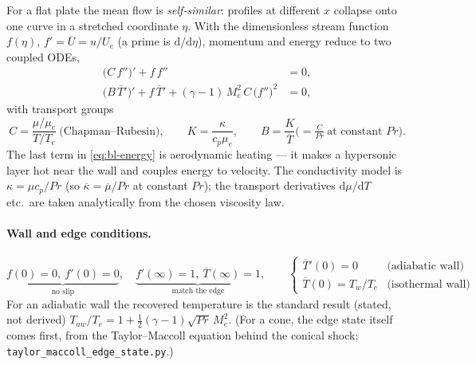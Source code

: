 \documentclass[11pt]{article}
\newcommand{\Mae}{M_e}
\renewcommand{\bar}[1]{\overline{#1}}
\begin{document}
For a flat plate the mean flow is \emph{self-similar}: profiles at different $x$ collapse onto one curve in
a stretched coordinate $\eta$. With the dimensionless stream function $f(\eta)$, $f'=\bar U=u/U_e$ (a prime
is $\mathrm d/\mathrm d\eta$), momentum and energy reduce to two coupled ODEs,
\begin{align}
  \big(C\,f''\big)' + f\,f'' &= 0, \label{eq:bl-mom}\\
  \big(B\,\bar T{}'\big)' + f\,\bar T{}' + (\gamma-1)\,\Mae^2\,C\,\big(f''\big)^2 &= 0, \label{eq:bl-energy}
\end{align}
with transport groups
\begin{equation}
  C=\frac{\mu/\mu_e}{T/T_e}\ \text{(Chapman--Rubesin)},\qquad K=\frac{\kappa}{c_p\mu_e},\qquad
  B=\frac{K}{\bar T}\Big(=\tfrac{C}{\mathit{Pr}}\ \text{at constant }\mathit{Pr}\Big).
\end{equation}
The last term in \eqref{eq:bl-energy} is aerodynamic heating --- it makes a hypersonic layer hot near the
wall and couples energy to velocity. The conductivity model is $\kappa=\mu c_p/\mathit{Pr}$ (so
$\bar\kappa=\bar\mu/\mathit{Pr}$ at constant $\mathit{Pr}$); the transport derivatives
$\mathrm d\mu/\mathrm dT$ etc.\ are taken analytically from the chosen viscosity law.

\paragraph{Wall and edge conditions.}
\begin{equation}\label{eq:blbc}
  \underbrace{f(0)=0,\ f'(0)=0}_{\text{no slip}},\quad
  \underbrace{f'(\infty)=1,\ \bar T(\infty)=1}_{\text{match the edge}},\qquad
  \begin{cases}\bar T{}'(0)=0 &\text{(adiabatic wall)}\\ \bar T(0)=T_w/T_e &\text{(isothermal wall)}\end{cases}
\end{equation}
For an adiabatic wall the recovered temperature is the standard result (stated, not derived)
$T_{aw}/T_e=1+\tfrac12(\gamma-1)\sqrt{\mathit{Pr}}\,\Mae^2$. (For a cone, the edge state itself comes first,
from the Taylor--Maccoll equation behind the conical shock; \texttt{taylor\_maccoll\_edge\_state.py}.)
\end{document}
